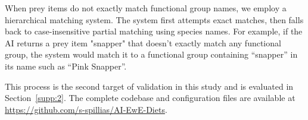 When prey items do not exactly match functional group names, we employ a hierarchical matching system. The system first attempts exact matches, then falls back to case-insensitive partial matching using species names. For example, if the AI returns a prey item "snapper" that doesn't exactly match any functional group, the system would match it to a functional group containing ``snapper'' in its name such as ``Pink Snapper''.

This process is the second target of validation in this study and is evaluated in Section~\ref{supp:2}. The complete codebase and configuration files are available at \url{https://github.com/s-spillias/AI-EwE-Diets}.
